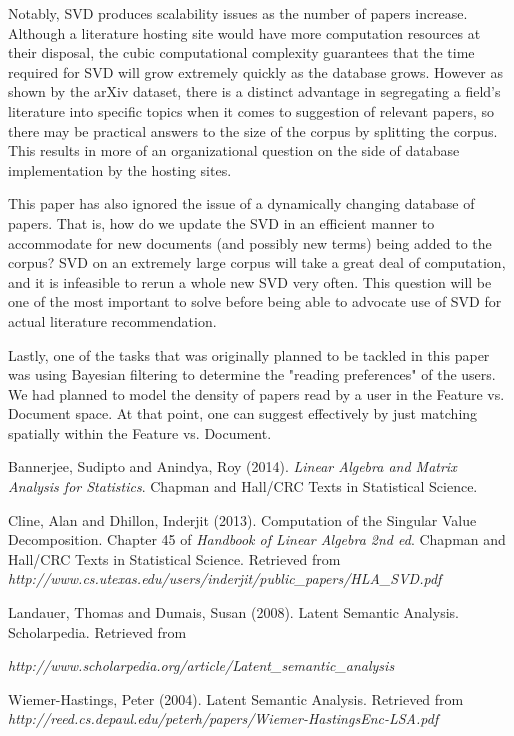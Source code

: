 \documentclass [12pt]{article}
\begin{document}
Notably, SVD produces scalability issues as the number of papers increase. Although a literature hosting site would have more computation resources at their disposal, the cubic computational complexity guarantees that the time required for SVD will grow extremely quickly as the database grows. However as shown by the arXiv dataset, there is a distinct advantage in segregating a field's literature into specific topics when it comes to suggestion of relevant papers, so there may be practical answers to the size of the corpus by splitting the corpus. This results in more of an organizational question on the side of database implementation by the hosting sites. 

This paper has also ignored the issue of a dynamically changing database of papers. That is, how do we update the SVD in an efficient manner to accommodate for new documents (and possibly new terms) being added to the corpus? SVD on an extremely large corpus will take a great deal of computation, and it is infeasible to rerun a whole new SVD very often. This question will be one of the most important to solve before being able to advocate use of SVD for actual literature recommendation. 

Lastly, one of the tasks that was originally planned to be tackled in this paper was using Bayesian filtering to determine the "reading preferences" of the users. We had planned to model the density of papers read by a user in the Feature vs. Document space. At that point, one can suggest effectively by just matching spatially within the Feature vs. Document. 

\begin{thebibliography}{9}



Bannerjee, Sudipto and  Anindya, Roy (2014).
\textit{Linear Algebra and Matrix Analysis for Statistics}. Chapman and Hall/CRC Texts in Statistical Science.

Cline, Alan and Dhillon, Inderjit (2013).  Computation of the Singular Value Decomposition. Chapter 45 of \textit{Handbook of Linear Algebra 2nd ed}. Chapman and Hall/CRC Texts in Statistical Science. Retrieved from \textit{http://www.cs.utexas.edu/users/inderjit/public\_papers/HLA\_SVD.pdf}

Landauer, Thomas and Dumais, Susan (2008). Latent Semantic Analysis. Scholarpedia.
Retrieved from

\textit{http://www.scholarpedia.org/article/Latent\_semantic\_analysis}

Wiemer-Hastings, Peter (2004). Latent Semantic Analysis. Retrieved from \textit{http://reed.cs.depaul.edu/peterh/papers/Wiemer-HastingsEnc-LSA.pdf}



\end{thebibliography} 
 
\end{document}
